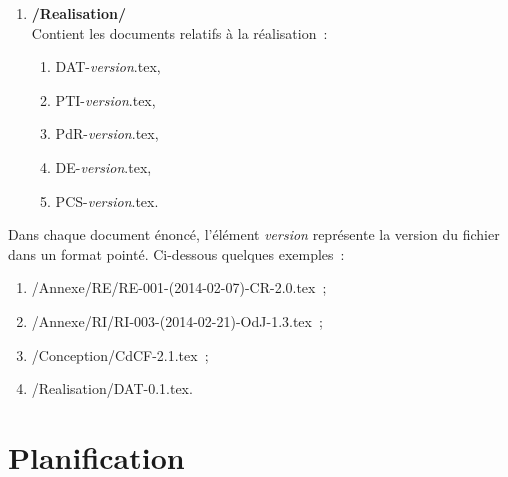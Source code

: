 \documentclass[11pt,fleqn]{report}
\begin{document}
\begin{enumerate}
\begin{enumerate}
	\end{enumerate}
	\item \textbf{/Realisation/}
	\\
	Contient les documents relatifs à la réalisation~:
	\begin{enumerate}
		\item DAT-\textit{version}.tex,
		\item PTI-\textit{version}.tex,
		\item PdR-\textit{version}.tex,
		\item DE-\textit{version}.tex,
		\item PCS-\textit{version}.tex.
	\end{enumerate}
\end{enumerate}
Dans chaque document énoncé, l'élément \textit{version} représente la version du fichier dans un format pointé. Ci-dessous quelques exemples~:
\begin{enumerate}
	\item /Annexe/RE/RE-001-(2014-02-07)-CR-2.0.tex~;
	\item /Annexe/RI/RI-003-(2014-02-21)-OdJ-1.3.tex~;
	\item /Conception/CdCF-2.1.tex~;
	\item /Realisation/DAT-0.1.tex.
\end{enumerate}

\chapter{Planification}
\end{document}
